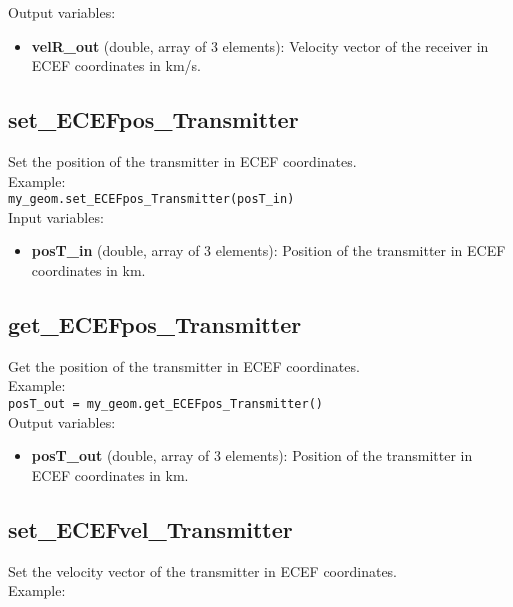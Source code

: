 Output variables:
\begin{itemize}
\item {\bf velR\_out} (double, array of 3 elements): Velocity vector of the receiver in ECEF coordinates in km/s.
\end{itemize}


\subsection{set\_ECEFpos\_Transmitter}

Set the position of the transmitter in ECEF coordinates.\\

Example:\\

\texttt{my\_geom.set\_ECEFpos\_Transmitter(posT\_in)}\\

Input variables:
\begin{itemize}
\item {\bf posT\_in} (double, array of 3 elements): Position of the transmitter in ECEF coordinates in km.
\end{itemize}


\subsection{get\_ECEFpos\_Transmitter}

Get the position of the transmitter in ECEF coordinates.\\

Example:\\

\texttt{posT\_out = my\_geom.get\_ECEFpos\_Transmitter()}\\

Output variables:
\begin{itemize}
\item {\bf posT\_out} (double, array of 3 elements): Position of the transmitter in ECEF coordinates in km.
\end{itemize}


\subsection{set\_ECEFvel\_Transmitter}

Set the velocity vector of the transmitter in ECEF coordinates.\\

Example:\\

